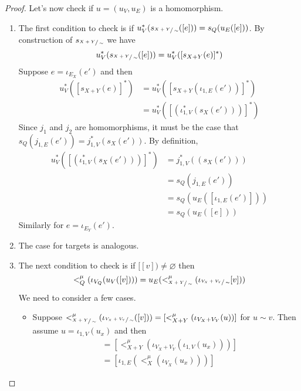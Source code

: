 \begin{proof}
    Let's now check if $u = (u_{V},u_{E})$ is a homomorphism.
    \begin{enumerate}
        \item The first condition to check is if $u_{V}^{*}(s_{\sfrac{X+Y}{\sim}}([e])) = s_{Q}(u_{E}([e]))$. 
              By construction of $s_{\sfrac{X+Y}{\sim}}$ we have
              \[
                u_{V}^{*}(s_{\sfrac{X+Y}{\sim}}([e])) = u_{V}^{*}([s_{X+Y}(e)]^{*})
              \]
              Suppose $e = \iota_{E_{X}}(e')$ and then
              \begin{align*}
                u_{V}^{*}([s_{X+Y}(e)]^{*}) &= u_{V}^{*}([s_{X+Y}(\iota_{1,E}(e'))]^{*})\\
                                            &= u_{V}^{*}([(\iota_{1,V}^{*}(s_{X}(e')))]^{*})
              \end{align*}
              Since $j_1$ and $j_2$ are homomorphisms, it must be the case that $s_{Q}(j_{1,E}(e')) = j_{1,V}^{*}(s_{X}(e'))$.
              By definition, 
              \begin{align*}                
                u_{V}^{*}([(\iota_{1,V}^{*}(s_{X}(e')))]^{*}) &= j_{1,V}^{*}((s_{X}(e')))\\ 
                &= s_{Q}(j_{1,E}(e'))\\
                &= s_{Q}(u_{E}([\iota_{1,E}(e')]))\\
                &= s_{Q}(u_{E}([e]))
            \end{align*}
            Similarly for $e = \iota_{E_{Y}}(e')$.
        \item The case for targets is analogous.
        \item The next condition to check is if $[[v]) \not = \varnothing$ then 
    \[
        <^{\mu}_{Q}(\iota_{V_{Q}}(u_{V}([v]))) = u_{E}(<^{\mu}_{\sfrac{X+Y}{\sim}}(\iota_{\sfrac{V_{X} + V_{Y}}{\sim}}[v]))
    \]
    We need to consider a few cases.
    \begin{itemize}
        \item Suppose $<_{\sfrac{X+Y}{\sim}}^{\mu}(\iota_{\sfrac{V_{X} + V_{Y}}{\sim}}([v])) = [<_{X+Y}^{\mu}(\iota_{V_{X} + V_{Y}}(u))]$ for $u \sim v$.
              Then assume $u = \iota_{1,V}(u_{x})$ and then 
              \begin{align*}
                [<_{X+Y}^{\mu}(\iota_{V_{X} + V_{Y}}(u))] &= [<_{X+Y}^{\mu}(\iota_{V_{X} + V_{Y}}(\iota_{1,V}(u_{x})))]\\
                &= [\iota_{1,E}(<_{X}^{\mu}(\iota_{V_{X}}(u_{x})))]
            \end{align*}

\end{itemize}
\end{enumerate}
\end{proof}
